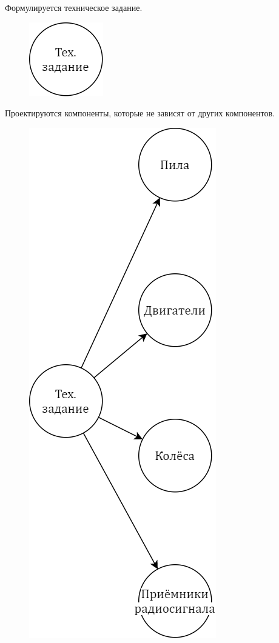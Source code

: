 \begin{frame} 
  Формулируется техническое задание.
  \begin{figure}[!ht]
    \centering
    \includegraphics[scale=0.2]{images/design.frame01.png}
    \label{fig:desginFrame01}
  \end{figure}
\end{frame}
\begin{frame} 
  Проектируются компоненты, которые не зависят от других компонентов.
  \begin{figure}[!ht]
    \centering
    \includegraphics[scale=0.2]{images/design.frame02.png}
    \label{fig:desginFrame02}
  \end{figure}
\end{frame}
